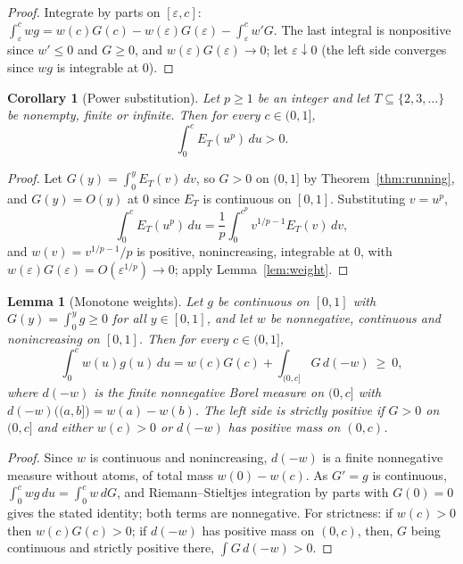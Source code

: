 \documentclass[11pt]{article}
\newtheorem{corollary}[theorem]{Corollary}
\newtheorem{lemma}[theorem]{Lemma}
\theoremstyle{remark}
\begin{document}
\begin{proof}
Integrate by parts on $[\varepsilon,c]$:
$\int_\varepsilon^cwg=w(c)G(c)-w(\varepsilon)G(\varepsilon)
-\int_\varepsilon^cw'G$. The last integral is nonpositive since
$w'\le0$ and $G\ge0$, and $w(\varepsilon)G(\varepsilon)\to0$; let
$\varepsilon\downarrow0$ (the left side converges since $wg$ is
integrable at $0$).
\end{proof}

\begin{corollary}[Power substitution]\label{lem:power}
Let $p\ge1$ be an integer and let $T\subseteq\{2,3,\dots\}$ be
nonempty, finite or infinite. Then for every $c\in(0,1]$,
\[
  \int_0^cE_T(u^p)\,du>0 .
\]
\end{corollary}

\begin{proof}
Let $G(y)=\int_0^yE_T(v)\,dv$, so $G>0$ on $(0,1]$ by
Theorem~\ref{thm:running}, and $G(y)=O(y)$ at $0$ since $E_T$ is
continuous on $[0,1]$. Substituting $v=u^p$,
\[
  \int_0^cE_T(u^p)\,du=\frac1p\int_0^{c^p}v^{1/p-1}E_T(v)\,dv,
\]
and $w(v)=v^{1/p-1}/p$ is positive, nonincreasing, integrable at $0$,
with $w(\varepsilon)G(\varepsilon)=O(\varepsilon^{1/p})\to0$; apply
Lemma~\ref{lem:weight}.
\end{proof}

\begin{lemma}[Monotone weights]\label{lem:stieltjes}
Let $g$ be continuous on $[0,1]$ with $G(y)=\int_0^yg\ge0$ for all
$y\in[0,1]$, and let $w$ be nonnegative, continuous and nonincreasing on
$[0,1]$. Then for every $c\in(0,1]$,
\[
  \int_0^cw(u)g(u)\,du
  =w(c)G(c)+\int_{(0,c]}G\,d(-w)\ \ge\ 0,
\]
where $d(-w)$ is the finite nonnegative Borel measure on $(0,c]$ with
$d(-w)\bigl((a,b]\bigr)=w(a)-w(b)$. The left side is strictly positive
if $G>0$ on $(0,c]$ and either $w(c)>0$ or $d(-w)$ has positive mass on
$(0,c)$.
\end{lemma}

\begin{proof}
Since $w$ is continuous and nonincreasing, $d(-w)$ is a finite
nonnegative measure without atoms, of total mass $w(0)-w(c)$. As
$G'=g$ is continuous, $\int_0^cwg\,du=\int_0^cw\,dG$, and
Riemann--Stieltjes integration by parts with $G(0)=0$ gives the stated
identity; both terms are nonnegative. For strictness: if $w(c)>0$ then
$w(c)G(c)>0$; if $d(-w)$ has positive mass on $(0,c)$, then, $G$ being
continuous and strictly positive there, $\int G\,d(-w)>0$.
\end{proof}
\end{document}
